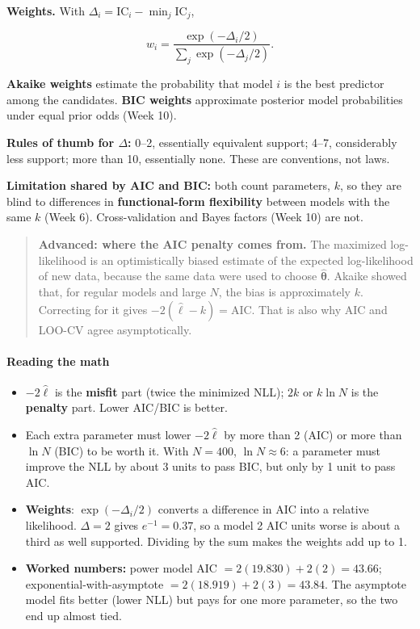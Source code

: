 \textbf{Weights.} With
\(\Delta_i = \mathrm{IC}_i - \min_j \mathrm{IC}_j\),

\[
w_i = \frac{\exp(-\Delta_i/2)}{\sum_j \exp(-\Delta_j/2)}.
\]

\textbf{Akaike weights} estimate the probability that model \(i\) is the
best predictor among the candidates. \textbf{BIC weights} approximate
posterior model probabilities under equal prior odds (Week 10).

\textbf{Rules of thumb for \(\Delta\):} 0--2, essentially equivalent
support; 4--7, considerably less support; more than 10, essentially
none. These are conventions, not laws.

\textbf{Limitation shared by AIC and BIC:} both count parameters, \(k\),
so they are blind to differences in \textbf{functional-form flexibility}
between models with the same \(k\) (Week 6). Cross-validation and Bayes
factors (Week 10) are not.

\begin{quote}
\textbf{Advanced: where the AIC penalty comes from.} The maximized
log-likelihood is an optimistically biased estimate of the expected
log-likelihood of new data, because the same data were used to choose
\(\hat{\boldsymbol\theta}\). Akaike showed that, for regular models and
large \(N\), the bias is approximately \(k\). Correcting for it gives
\(-2(\hat\ell - k) = \mathrm{AIC}\). That is also why AIC and LOO-CV
agree asymptotically.
\end{quote}

\paragraph{Reading the math}

\begin{itemize}
\tightlist
\item
  \(-2\hat\ell\) is the \textbf{misfit} part (twice the minimized NLL);
  \(2k\) or \(k\ln N\) is the \textbf{penalty} part. Lower AIC/BIC is
  better.
\item
  Each extra parameter must lower \(-2\hat\ell\) by more than 2 (AIC) or
  more than \(\ln N\) (BIC) to be worth it. With \(N = 400\),
  \(\ln N \approx 6\): a parameter must improve the NLL by about 3 units
  to pass BIC, but only by 1 unit to pass AIC.
\item
  \textbf{Weights}: \(\exp(-\Delta_i/2)\) converts a difference in AIC
  into a relative likelihood. \(\Delta = 2\) gives \(e^{-1} = 0.37\), so
  a model 2 AIC units worse is about a third as well supported. Dividing
  by the sum makes the weights add up to 1.
\item
  \textbf{Worked numbers:} power model AIC
  \(= 2(19.830) + 2(2) = 43.66\); exponential-with-asymptote
  \(= 2(18.919) + 2(3) = 43.84\). The asymptote model fits better (lower
  NLL) but pays for one more parameter, so the two end up almost tied.
\end{itemize}

